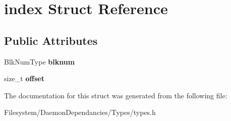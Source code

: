 \hypertarget{structindex}{}\section{index Struct Reference}
\label{structindex}
\subsection*{Public Attributes}
\begin{DoxyCompactItemize}
\item 
Blk\+Num\+Type {\bfseries blknum}\hypertarget{structindex_a4601f529cd0b66a29506c272687be78d}{}\label{structindex_a4601f529cd0b66a29506c272687be78d}

\item 
size\+\_\+t {\bfseries offset}\hypertarget{structindex_a5ebe7af77c7d366b339d77f992078e11}{}\label{structindex_a5ebe7af77c7d366b339d77f992078e11}

\end{DoxyCompactItemize}


The documentation for this struct was generated from the following file\+:\begin{DoxyCompactItemize}
\item 
Filesystem/\+Daemon\+Dependancies/\+Types/types.\+h\end{DoxyCompactItemize}

